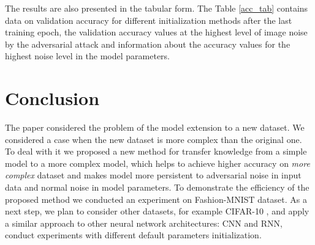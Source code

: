 \documentclass[conference]{IEEEtran}
\begin{document}
The results are also presented in the tabular form. The Table \ref{acc_tab} contains data on validation accuracy for different initialization methods after the last training epoch, the validation accuracy values at the highest level of image noise by the adversarial attack and information about the accuracy values for the highest noise level in the model parameters.

\section{Conclusion}
The paper considered the problem of the model extension to a new dataset. We considered a case when the new dataset is more complex than the original one. To deal with it we proposed a new method for transfer knowledge from a simple model to a more complex model, which helps to achieve higher accuracy on \textit{more complex} dataset and makes model more persistent to adversarial noise in input data and normal noise in model parameters. To demonstrate the efficiency of the proposed method we conducted an experiment on Fashion-MNIST dataset. 
 As a next step, we plan to consider other datasets, for example CIFAR-10 \cite{cifar10}, and apply a similar approach to other neural network architectures: CNN and RNN, conduct experiments with different default parameters initialization.



\end{document}
